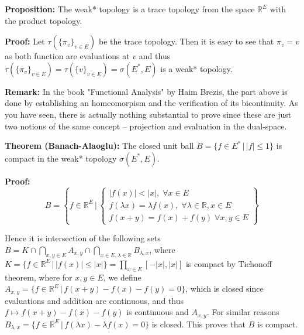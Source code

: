 \documentclass{article}
\begin{document}
\vspace{1ex}
\textbf{Proposition:} The weak* topology is a trace topology from the space
$\mathbb{R}^E$ with the product topology.

\vspace{1ex}
\textbf{Proof:} Let $\tau(\{\pi_v\}_{v\in E})$ be the trace topology. Then it
is easy to see that $\pi_v=v$ as both function are evaluations at $v$ and thus
$\tau(\{\pi_v\}_{v\in E})=\tau(\{v\}_{v\in E})=\sigma(E^*, E)$ is a weak*
topology.

\vspace{1ex}
\textbf{Remark:} In the book "Functional Analysis" by Haim Brezis, the part
above is done by establishing an homeomorpism and the verification of its bicontinuity.
As you have seen, there is actually nothing substantial to prove since these are 
just two notions of the same concept – projection and evaluation in the dual-space.

\vspace{1ex}
\textbf{Theorem (Banach-Alaoglu):} The closed unit ball $B=\{f\in E^*\,|\,|
f|\leq 1\}$ is compact in the weak* topology $\sigma(E^*, E)$.

\vspace{1ex}
\textbf{Proof:}
\[ B=\left\{f\in\mathbb{R}^E\,|\,
\begin{cases}
    |f(x)|<|x|,\;\forall x\in E\\
    f(\lambda x)=\lambda f(x),\;\forall\lambda\in\mathbb{R}, x\in E\\
    f(x+y)=f(x)+f(y)\;\forall x,y\in E
\end{cases}
\right\} \] 

Hence it is intersection of the following sets $B=K\cap\bigcap_{x,y\in E} A_{x,y}
\cap\bigcap_{x\in E, \lambda\in\mathbb{R}}B_{\lambda,x}$, where $K=\{f\in\mathbb
{R}^E\,|\,|f(x)|\leq|x|\}=\prod_{x\in E}[-|x|, |x|]$ is compact by Tichonoff
theorem, where for $x,y\in E$, we define $A_{x,y}=\{f\in\mathbb{R}^E\,|\,f(x+y)-
f(x)-f(y)=0\}$, which is closed since evaluations and addition are continuous, and
thus $f\mapsto f(x+y)-f(x)-f(y)$ is continuous and $A_{x,y}$. For similar
reasons $B_{\lambda, x}=\{f\in\mathbb{R}^E\,|\,f(\lambda x)-\lambda f(x)=0\}$ is
closed. This proves that $B$ is compact.
\end{document}
